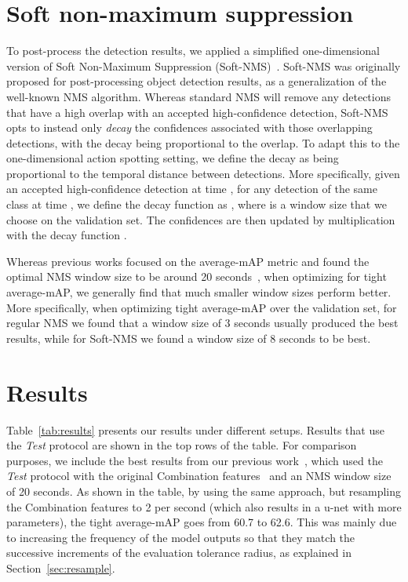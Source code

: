 \documentclass[10pt,twocolumn,letterpaper]{article}
\begin{document}
\section{Soft non-maximum suppression}
\label{sec:nms}

To post-process the detection results, we applied a simplified one-dimensional version of Soft Non-Maximum Suppression (Soft-NMS)~\cite{bodla2017soft}. Soft-NMS was originally proposed for post-processing object detection results, as a generalization of the well-known NMS algorithm. Whereas standard NMS will remove any detections that have a high overlap with an accepted high-confidence detection, Soft-NMS opts to instead only {\it decay} the confidences associated with those overlapping detections, with the decay being proportional to the overlap. To adapt this to the one-dimensional action spotting setting, we define the decay as being proportional to the temporal distance between detections. More specifically, given an accepted high-confidence detection at time , for any detection of the same class at time , we define the decay function as , where  is a window size that we choose on the validation set. The confidences are then updated by multiplication with the decay function .

Whereas previous works focused on the average-mAP metric and found the optimal NMS window size to be around 20 seconds~\cite{giancola2021temporally, zhou2021feature, soares2022temporally}, when optimizing for tight average-mAP, we generally find that much smaller window sizes perform better. More specifically, when optimizing tight average-mAP over the validation set, for regular NMS we found that a window size of 3 seconds usually produced the best results, while for Soft-NMS we found a window size of 8 seconds to be best.

\section{Results}
\label{sec:results}



Table~\ref{tab:results} presents our results under different setups. Results that use the {\it Test} protocol are shown in the top rows of the table. For comparison purposes, we include the best results from our previous work~\cite{soares2022temporally}, which used the {\it Test} protocol with the original Combination features~\cite{zhou2021feature} and an NMS window size of 20 seconds. As shown in the table, by using the same approach, but resampling the Combination features to 2 per second (which also results in a u-net with more parameters), the tight average-mAP goes from 60.7 to 62.6. This was mainly due to increasing the frequency of the model outputs so that they match the successive increments of the evaluation tolerance radius, as explained in Section~\ref{sec:resample}.
\end{document}
